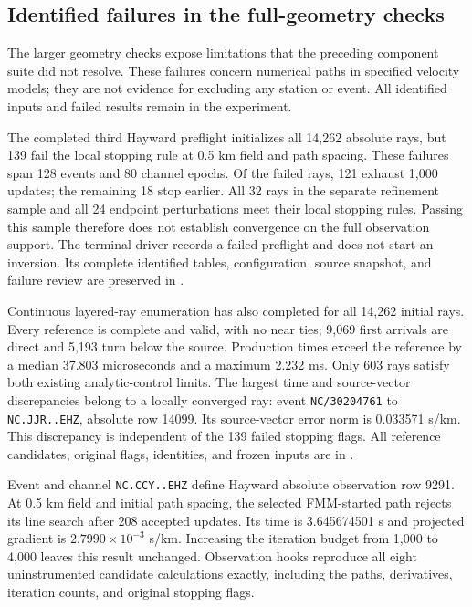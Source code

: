 \subsection{Identified failures in the full-geometry checks}
The larger geometry checks expose limitations that the preceding component
suite did not resolve. These failures concern numerical paths in specified
velocity models; they are not evidence for excluding any station or event.
All identified inputs and failed results remain in the experiment.

The completed third Hayward preflight initializes all 14,262 absolute rays,
but 139 fail the local stopping rule at 0.5 km field and path spacing.
These failures span 128 events and 80 channel epochs. Of the failed rays,
121 exhaust 1,000 updates; the remaining 18 stop earlier. All 32 rays in
the separate refinement sample and all 24 endpoint perturbations meet their
local stopping rules. Passing this sample therefore does not establish
convergence on the full observation support. The terminal driver records
a failed preflight and does not start an inversion. Its complete identified
tables, configuration, source snapshot, and failure review are preserved in
.

Continuous layered-ray enumeration has also completed for all 14,262
initial rays. Every reference is complete and valid, with no near ties;
9,069 first arrivals are direct and 5,193 turn below the source. Production
times exceed the reference by a median 37.803 microseconds and a maximum
2.232 ms. Only 603 rays satisfy both existing analytic-control limits.
The largest time and source-vector discrepancies belong to a locally
converged ray: event \texttt{NC/30204761} to \texttt{NC.JJR..EHZ},
absolute row 14099. Its source-vector error norm is 0.033571 s/km.
This discrepancy is independent of the 139 failed stopping flags.
All reference candidates, original flags,
identities, and frozen inputs are in
.

Event  and channel
\texttt{NC.CCY..EHZ} define Hayward absolute observation row 9291.
At 0.5 km field and initial path spacing,
the selected FMM-started path rejects its line search after 208 accepted
updates. Its time is 3.645674501 s and projected gradient is
$2.7990\times10^{-3}$ s/km. Increasing the iteration budget from 1,000 to
4,000 leaves this result unchanged. Observation hooks reproduce all eight
uninstrumented candidate calculations exactly, including the paths,
derivatives, iteration counts, and original stopping flags.

